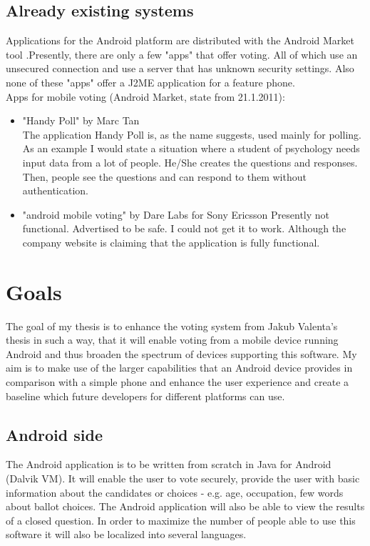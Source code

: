 \documentclass[11pt,twoside,a4paper]{book}
\begin{document}
\subsection{Already existing systems}
Applications for the Android platform are distributed with the Android Market tool \cite{MarketAnd} .Presently, there are only a few "apps"  that offer voting. All of which use an unsecured connection and use a server that has unknown security settings. Also none of these "apps" offer a J2ME application for a feature phone. \\
Apps for mobile voting (Android Market, state from 21.1.2011): 
\begin{itemize}
\item "Handy Poll" by Marc Tan \cite{HandyPoll} \\
The application Handy Poll is, as the name suggests, used mainly for polling. As an example I would state a situation where a student of psychology needs input data from a lot of people. He/She creates the questions and responses. Then, people see the questions and can respond to them without authentication.
\item "android mobile voting" by Dare Labs for Sony Ericsson \cite{DareLabs}
Presently not functional. Advertised to be safe. I could not get it to work. Although the company website \cite{DareLabsWeb} is claiming that the application is fully functional.
\end{itemize}



\section{Goals}

The goal of my thesis is to enhance the voting system from Jakub Valenta's\cite{bakalarkaJV} thesis in such a way, that it will enable voting from a mobile device running Android\cite{whatisAnd} and thus broaden the spectrum of devices supporting this software. My aim is to make use of the larger capabilities that an Android device provides in comparison with a simple phone and enhance the user experience and create a baseline which future developers for different platforms can use. 

\subsection{Android side}
The Android application is to be written from scratch in Java for Android (Dalvik VM\cite{DalvikVM}). It will enable the user to vote securely, provide the user with basic information about the candidates or choices - e.g. age, occupation, few words about ballot choices. The Android application will also be able to view the results of a closed question. In order to maximize the number of people able to use this software it will also be localized into several languages.
\end{document}

